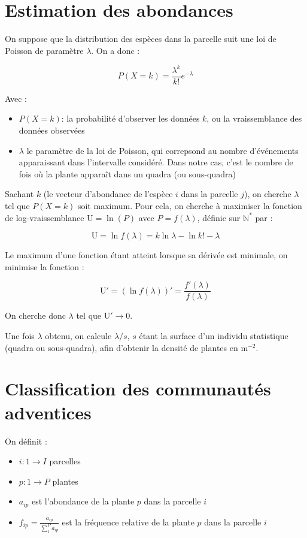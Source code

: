 \documentclass[a4paper, 12pt]{article}
\begin{document}
\section{Estimation des abondances}

On suppose que la distribution des espèces dans la parcelle suit une loi de
Poisson de paramètre $\lambda$.
On a donc :

\[
  P(X = k) = \frac{\lambda^k}{k!} e^{-\lambda}
\]

Avec :
\begin{itemize}
  \item $P(X = k)$: la probabilité d'observer les données $k$, ou la
    vraissemblance des données observées
  \item $\lambda$ le paramètre de la loi de Poisson, qui correpsond au nombre
    d'événements apparaissant dans l'intervalle considéré. Dans notre cas, c'est
    le nombre de fois où la plante apparaît dans un quadra (ou sous-quadra)
\end{itemize}

Sachant $k$ (le vecteur d'abondance de l'espèce $i$ dans la parcelle $j$), on
cherche $\lambda$ tel que $P(X=k)$ soit maximum.
Pour cela, on cherche à maximiser la fonction de log-vraissemblance $\mathrm{U}
= \ln(P)$ avec $ P = f(\lambda)$, définie sur $\mathbb{N}^*$ par :

\[
  \mathrm{U} = \ln f(\lambda) = k\ln \lambda - \ln k! - \lambda
\]

Le maximum d'une fonction étant atteint lorsque sa dérivée est minimale, on
minimise la fonction :

\[
  \mathrm{U}' = (\ln f(\lambda))' = \frac{f'(\lambda)}{f(\lambda)}
\]

On cherche donc $\lambda$ tel que $\mathrm{U}' \to 0$.

Une fois $\lambda$ obtenu, on calcule $\lambda / s$, $s$ étant la surface d'un
individu statistique (quadra ou sous-quadra), afin d'obtenir la densité de
plantes en $\mathrm{m}^{-2}$.


\section{Classification des communautés adventices}

On définit :

\begin{itemize}
  \item $ i : 1 \to I $ parcelles
  \item $ p : 1 \to P $ plantes
  \item $ a_{ip} $ est l'abondance de la plante $p$ dans la parcelle $i$
  \item $f_{ip} = \frac{a_{ip}}{\sum_{1}^{P} a_{ip}}$ est la fréquence relative
    de la plante $p$ dans la parcelle $i$
\end{itemize}
\end{document}
